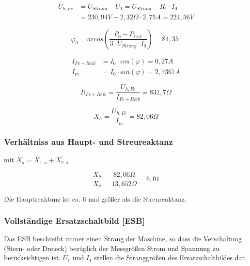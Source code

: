 \documentclass[conference]{IEEEtran}
\begin{document}
\begin{align*}
    U_{h, Fe} & = U_{Strang} - U_{1} = U_{Strang} - R_{1} \cdot I_{0}        \\
              & = 230,94\si{V} - 2,32 \Omega \cdot 2,75\si{A} = 224,56\si{V}
\end{align*}


\begin{equation}
    \varphi_{0} = arcos\left( \dfrac{P_{0} - P_{Cu1} }{3 \cdot U_{Strang} \cdot I_{0} }\right) = 84,35^\circ
\end{equation}


\begin{align*}
    I_{Fe+Reib} & = I_{0} \cdot cos( \varphi ) = 0,27\si{A}   \\
    I_{m}       & = I_{0} \cdot sin( \varphi ) = 2,7367\si{A}
\end{align*}

\begin{equation}
    R_{Fe+Reib} = \dfrac{ U_{h, Fe} }{ I_{Fe+Reib} } = 831,7 \Omega
\end{equation}

\begin{equation}
    X_{h} = \dfrac{ U_{h, Fe} }{ I_{m} } = 82,06 \Omega
\end{equation}

\subsubsection{Verhältniss aus Haupt- und Streureaktanz}

mit $X_{ \sigma } =  X_{1, \sigma } + X_{2, \sigma }^\prime$

\begin{equation}
    \dfrac{ X_{h}}{X_{ \sigma }} = \dfrac{ 82,06 \Omega }{ 13,652 \Omega } = 6,01
\end{equation}

Die Hauptreaktanz ist ca. 6 mal größer als die Streureaktanz.

\subsubsection{Vollständige Ersatzschaltbild [ESB]}
Das ESB beschreibt immer einen Strang der Maschine, so dass die Verschaltung
(Stern- oder Dreieck) bezüglich der Messgrößen Strom und Spannung zu
berücksichtigen ist. $U_1$ und $I_1$ stellen die Stranggrößen des
Ersatzschaltbildes dar.
\end{document}
